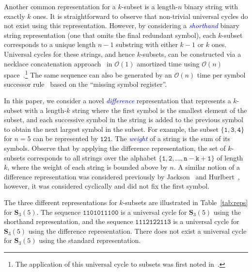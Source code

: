 \documentclass[US-letter,USenglish,authorcolumns,autoref]{lipics-v2021}
\renewcommand{\tt} {\mathtt}
\newcommand{\bS}{\mathbf{S}}
\newcommand{\defo}[1] {\emph{\textcolor{blue}{#1}}}
\begin{document}
Another common representation for a $k$-subset is a length-$n$ binary string with exactly $k$ ones.  It is straightforward to observe that non-trivial universal cycles do not exist using this representation.   
However, by considering a \defo{shorthand} binary string representation (one that omits the final redundant symbol), each $k$-subset corresponds to a unique length $n{-}1$ substring with either $k{-}1$ or $k$ ones.  Universal cycles for these strings, and hence $k$-subsets, can be constructed via a necklace concatenation approach~\cite{fixedweight2} in $\mathcal{O}(1)$ amortized time using $\mathcal{O}(n)$ space~\cite{fdgray13}.\footnote{The application of this universal cycle to subsets was first noted in~\cite{godbole2011}.} The same sequence can also be generated by an $\mathcal{O}(n)$ time per symbol successor rule~\cite{coolest} based on the ``missing symbol register''. %


In this paper, we consider a 
novel \defo{difference} representation that represents a $k$-subset with a length-$k$ string where the first symbol is the smallest element of the subset, and each successive symbol in the string is added to the previous symbol to obtain the next largest symbol in the subset. For example, the subset $\{\tt{1,3,4}\}$ for $n=5$ can be represented by $\tt{121}$.  The \defo{weight} of a string is the sum of its symbols. 
Observe that by applying the difference representation,
the set of $k$-subsets corresponds to all strings  over the alphabet $\{\tt{1,2,\ldots, n{-}k{+}1}\}$ of length $k$, where the weight of each string is bounded above by $n$. 
A similar notion of a difference representation was considered previously by Jackson~\cite{jackson} and Hurlbert~\cite{hurlbert}, however, it was considered cyclically and did not fix the first symbol.



%
The three different representations for $k$-subsets are illustrated in Table~\ref{tab:reps} for $\bS_3(5)$.
The sequence $\tt{1101011100}$ is a universal cycle for $\mathbf{S}_3(5)$ using the shorthand representation, and the sequence $\tt{1112122113}$
is a universal cycle for $\mathbf{S}_3(5)$ using the difference representation.  
There does not exist a universal cycle for $\mathbf{S}_3(5)$ using the standard representation. 
\end{document}
